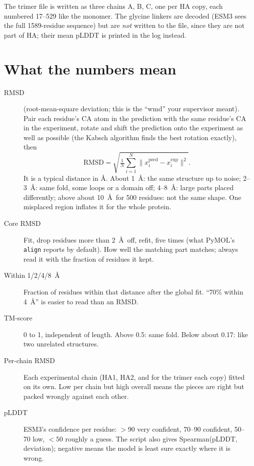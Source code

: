 \documentclass[11pt,a4paper]{article}
\newcommand{\file}[1]{\texttt{#1}}
\begin{document}
The trimer file is written as three chains A, B, C, one per HA copy, each
numbered 17--529 like the monomer. The glycine linkers are decoded (ESM3 sees
the full 1589-residue sequence) but are \emph{not} written to the file, since
they are not part of HA; their mean pLDDT is printed in the log instead.

\section{What the numbers mean}

\begin{description}
  \item[RMSD] (root-mean-square deviation; this is the ``wmd'' your supervisor
    meant). Pair each residue's CA atom in the prediction with the same
    residue's CA in the experiment, rotate and shift the prediction onto the
    experiment as well as possible (the Kabsch algorithm finds the best rotation
    exactly), then
    \[ \mathrm{RMSD} = \sqrt{\tfrac{1}{N}\textstyle\sum_{i=1}^{N} \lVert x_i^{\mathrm{pred}} - x_i^{\mathrm{exp}} \rVert^2 }. \]
    It is a typical distance in \AA. About 1~\AA: the same structure up to
    noise; 2--3~\AA: same fold, some loops or a domain off; 4--8~\AA: large parts
    placed differently; above about 10~\AA\ for 500 residues: not the same shape.
    One misplaced region inflates it for the whole protein.
  \item[Core RMSD] Fit, drop residues more than 2~\AA\ off, refit, five times
    (what PyMOL's \file{align} reports by default). How well the matching part
    matches; always read it with the fraction of residues it kept.
  \item[Within 1/2/4/8~\AA] Fraction of residues within that distance after the
    global fit. ``70\% within 4~\AA'' is easier to read than an RMSD.
  \item[TM-score] 0 to 1, independent of length. Above 0.5: same fold. Below
    about 0.17: like two unrelated structures.
  \item[Per-chain RMSD] Each experimental chain (HA1, HA2, and for the trimer
    each copy) fitted on its own. Low per chain but high overall means the pieces
    are right but packed wrongly against each other.
  \item[pLDDT] ESM3's confidence per residue: $>90$ very confident, 70--90
    confident, 50--70 low, $<50$ roughly a guess. The script also gives
    Spearman(pLDDT, deviation); negative means the model is least sure exactly
    where it is wrong.
\end{description}
\end{document}
